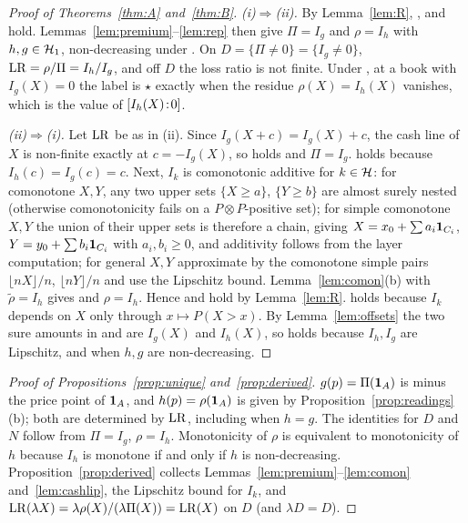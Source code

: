 \begin{proof}[Proof of Theorems~\ref{thm:A} and~\ref{thm:B}]
\emph{(i)$\Rightarrow$(ii).} By Lemma~\ref{lem:R}, \axP, \axN{} and \axCM{} hold. Lemmas~\ref{lem:premium}--\ref{lem:rep} then give $\Pi=I_g$ and $\rho=I_h$ with
$h,g\in\mathcal H_1$, non-decreasing under \axRM. On $D=\{\Pi\ne0\}=\{I_g\ne0\}$, $\mathrm{LR}=\rho/\Pi=I_h/I_g$, and off $D$
the loss ratio is not finite. Under , at a book with $I_g(X)=0$ the label is $\star$ exactly when the
residue $\rho(X)=I_h(X)$ vanishes, which is the value of $[I_h(X)\!:\!0]$.

\emph{(ii)$\Rightarrow$(i).} Let $\mathrm{LR}$ be as in (ii). Since $I_g(X+c)=I_g(X)+c$, the cash line of $X$ is non-finite
exactly at $c=-I_g(X)$, so \axP{} holds and $\Pi=I_g$. \axN{} holds because $I_h(c)=I_g(c)=c$. Next, $I_k$ is
comonotonic additive for $k\in\mathcal H$: for comonotone $X,Y$, any two upper sets $\{X\ge a\}$, $\{Y\ge b\}$ are almost
surely nested (otherwise comonotonicity fails on a $P\otimes P$-positive set); for simple comonotone $X,Y$ the
union of their upper sets is therefore a chain, giving $X=x_0+\sum a_i\mathbf 1_{C_i}$, $Y=y_0+\sum b_i\mathbf 1_{C_i}$ with
$a_i,b_i\ge0$, and additivity follows from the layer computation; for general $X,Y$ approximate by the comonotone
simple pairs $\lfloor nX\rfloor/n$, $\lfloor nY\rfloor/n$ and use the Lipschitz bound. Lemma~\ref{lem:comon}(b) with
$\tilde\rho=I_h$ gives \axCM{} and $\rho=I_h$. Hence \axPe{} and \axR{} hold by Lemma~\ref{lem:R}. \axLI{} holds because $I_k$ depends on $X$ only through
$x\mapsto P(X>x)$. By Lemma~\ref{lem:offsets} the two sure amounts in \axRC{} and \axRM{} are $I_g(X)$ and $I_h(X)$, so
\axRC{} holds because $I_h,I_g$ are Lipschitz, and \axRM{} when $h,g$ are non-decreasing. \qedhere
\end{proof}

\begin{proof}[Proof of Propositions~\ref{prop:unique} and~\ref{prop:derived}]
$g(p)=\Pi(\mathbf 1_A)$ is minus the price point of $\mathbf 1_A$, and $h(p)=\rho(\mathbf 1_A)$ is given by
Proposition~\ref{prop:readings}(b); both are determined by $\mathrm{LR}$, including when $h=g$. The identities for $D$ and
$N$ follow from $\Pi=I_g$, $\rho=I_h$. Monotonicity of $\rho$ is equivalent to monotonicity of $h$ because $I_h$ is
monotone if and only if $h$ is non-decreasing. Proposition~\ref{prop:derived} collects
Lemmas~\ref{lem:premium}--\ref{lem:comon} and~\ref{lem:cashlip}, the Lipschitz bound for $I_k$, and
$\mathrm{LR}(\lambda X)=\lambda\rho(X)/(\lambda\Pi(X))=\mathrm{LR}(X)$ on $D$ (and $\lambda D=D$). \qedhere
\end{proof}
